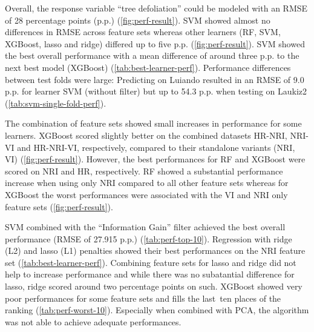 \documentclass[remotesensing,article,submit,moreauthors,pdftex]{Definitions/mdpi}
\begin{document}
Overall, the response variable \enquote{tree defoliation} could be modeled with an \ac{RMSE} of 28 percentage points (p.p.) (\autoref{fig:perf-result}).
SVM showed almost no differences in RMSE across feature sets whereas other learners (RF, SVM, XGBoost, lasso and ridge) differed up to five p.p. (\autoref{fig:perf-result}).
SVM showed the best overall performance with a mean difference of around three p.p. to the next best model (XGBoost) (\autoref{tab:best-learner-perf}).
Performance differences between test folds were large: Predicting on Luiando resulted in an RMSE of 9.0 p.p. for learner SVM (without filter) but up to 54.3 p.p. when testing on Laukiz2 (\autoref{tab:svm-single-fold-perf}).

The combination of feature sets showed small increases in performance for some learners.
XGBoost scored slightly better on the combined datasets HR-NRI, NRI-VI and HR-NRI-VI, respectively, compared to their standalone variants (NRI, VI) (\autoref{fig:perf-result}).
However, the best performances for RF and XGBoost were scored on NRI and HR, respectively.
RF showed a substantial performance increase when using only NRI compared to all other feature sets whereas for XGBoost the worst performances were associated with the VI and NRI only feature sets (\autoref{fig:perf-result}).

SVM combined with the \enquote{Information Gain} filter achieved the best overall performance (RMSE of 27.915 p.p.) (\autoref{tab:perf-top-10}).
Regression with ridge (L2) and lasso (L1) penalties showed their best performances on the NRI feature set (\autoref{tab:best-learner-perf}).
Combining feature sets for lasso and ridge did not help to increase performance and while there was no subatantial difference for lasso, ridge scored around two percentage points on such.
XGBoost showed very poor performances for some feature sets and fills the last\ ten places of the ranking (\autoref{tab:perf-worst-10}).
Especially when combined with PCA, the algorithm was not able to achieve adequate performances.
\end{document}
